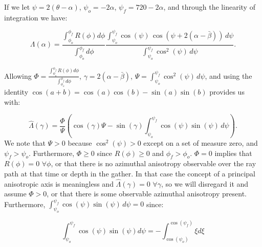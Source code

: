 If we let $\psi = 2\left( \theta-\alpha \right)$, $\psi_{o} = -2 \alpha$, $\psi_{f} = 720 - 2 \alpha$, and through the linearity of integration we have:

\begin{equation}
\label{eq:psysub}
\Lambda(\alpha) = \frac{  \int_{\phi_{o}} ^{\phi_{f}} R \left(\phi \right)d\phi}{\int_{\phi_{o}} ^{\phi_{f}} d\phi} \frac{\int_{\psi_o} ^{\psi_f } \cos \left(\psi \right) \, \cos \left(\psi + 2\left(\alpha - \bar{\beta} \right) \right)  \, d\psi}{\int_{\psi_o} ^{\psi_f } \cos^2 \left(\psi \right) \, d\psi } .
\end{equation}

Allowing $\Phi = \frac{  \int_{\phi_{o}} ^{\phi_{f}} R \left(\phi \right)d\phi}{\int_{\phi_{o}} ^{\phi_{f}} d\phi}$, $\gamma = 2\left(\alpha - \bar{\beta} \right)$, $\Psi = \int_{\psi_o} ^{\psi_f } \cos ^2 \left(\psi \right) \, d\psi $, and using the identity  $\cos(a+b) = \cos(a)\cos(b)-\sin(a)\sin(b)$ provides us with:

\begin{equation}
\label{eq:cosexp}
\hat{\Lambda}(\gamma) = \frac{\Phi}{\Psi} \left( \cos(\gamma)\Psi  - \sin(\gamma) \int_{\psi_o} ^{\psi_f } \cos(\psi)\sin(\psi) \, d\psi \right).
\end{equation}
We note that $\Psi > 0$ because $\cos^2(\psi) > 0 $ except on a set of measure zero, and $\psi_f > \psi_o$. Furthermore, $\Phi \geq 0$ since $R \left(\phi \right) \geq 0$ and $\phi_f > \phi_o$.  $\Phi = 0$ implies that $R \left( \phi \right) = 0 \,\, \forall \phi$, or that there is no azimuthal anisotropy observable over the ray path at that time or depth in the gather.  In that case the concept of a principal anisotropic axis is meaningless and $\hat{\Lambda}(\gamma) = 0 \,\, \forall \gamma$, so we will disregard it and assume $\Phi > 0$, or that there is some observable azimuthal anisotropy present.  Furthermore, $\int_{\psi_o} ^{\psi_f } \cos(\psi) \sin(\psi) \, d\psi  = 0$ since:

\begin{equation}
\label{eq:iszero}
\int_{\psi_o} ^{\psi_f } \cos(\psi)\sin(\psi) d\psi  = - \int_{\cos(\psi_o)} ^{\cos(\psi_f)} \xi d\xi 
\end{equation}

